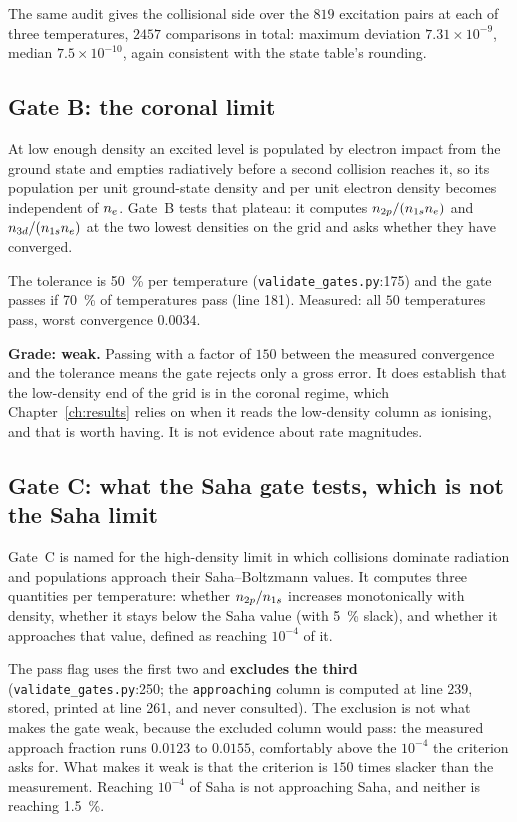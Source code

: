 The same audit gives the collisional side over the $819$ excitation pairs at
each of three temperatures, $2457$ comparisons in total: maximum deviation
$7.31\times10^{-9}$, median $7.5\times10^{-10}$, again consistent with the state
table's rounding.

\subsection{Gate B: the coronal limit}

At low enough density an excited level is populated by electron impact from the
ground state and empties radiatively before a second collision reaches it, so
its population per unit ground-state density and per unit electron density
becomes independent of $n_e$. Gate~B tests that plateau: it computes
$n_{2p}/(n_{1s}n_e)$ and $n_{3d}/(n_{1s}n_e)$ at the two lowest densities on the
grid and asks whether they have converged.

The tolerance is \SI{50}{\percent} per temperature
(\texttt{validate\_gates.py}:175) and the gate passes if \SI{70}{\percent} of
temperatures pass (line 181). Measured: all $50$ temperatures pass, worst
convergence $0.0034$.

\textbf{Grade: weak.} Passing with a factor of $150$ between the measured
convergence and the tolerance means the gate rejects only a gross error. It
does establish that the low-density end of the grid is in the coronal regime,
which Chapter~\ref{ch:results} relies on when it reads the low-density column
as ionising, and that is worth having. It is not evidence about rate
magnitudes.

\subsection{Gate C: what the Saha gate tests, which is not the Saha limit}

Gate~C is named for the high-density limit in which collisions dominate
radiation and populations approach their Saha--Boltzmann values. It computes
three quantities per temperature: whether $n_{2p}/n_{1s}$ increases monotonically
with density, whether it stays below the Saha value (with \SI{5}{\percent}
slack), and whether it approaches that value, defined as reaching $10^{-4}$ of
it.

The pass flag uses the first two and \textbf{excludes the third}
(\texttt{validate\_gates.py}:250; the \texttt{approaching} column is computed at
line 239, stored, printed at line 261, and never consulted). The exclusion is
not what makes the gate weak, because the excluded column would pass: the
measured approach fraction runs $0.0123$ to $0.0155$, comfortably above the
$10^{-4}$ the criterion asks for. What makes it weak is that the criterion is
$150$ times slacker than the measurement. Reaching $10^{-4}$ of Saha is not
approaching Saha, and neither is reaching \SI{1.5}{\percent}.


